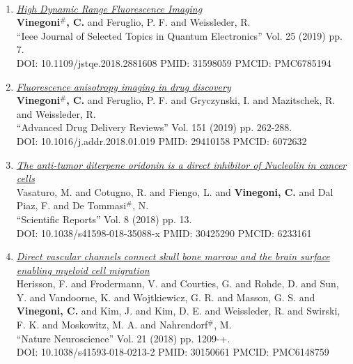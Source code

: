 \documentclass{resume}
\begin{document}
\begin{category}{~~}
\begin{enumerate}
\item \href{https://cvinegoni.github.io/assets/pdf/papers/2019-JSTQE.pdf}{\it  High Dynamic Range Fluorescence Imaging} \\ {\bf Vinegoni$^\#$, C.} and Feruglio, P. F. and Weissleder, R. \\ ``Ieee Journal of Selected Topics in Quantum Electronics'' Vol. 25 (2019) pp. 7. \\ DOI: 10.1109/jstqe.2018.2881608 PMID: 31598059 PMCID: PMC6785194

\item \href{https://cvinegoni.github.io/assets/pdf/papers/2019-ADDR.pdf}{\it  Fluorescence anisotropy imaging in drug discovery} \\ {\bf Vinegoni$^\#$, C.} and Feruglio, P. F. and Gryczynski, I. and Mazitschek, R. and Weissleder, R. \\ ``Advanced Drug Delivery Reviews'' Vol. 151 (2019) pp. 262-288. \\ DOI: 10.1016/j.addr.2018.01.019 PMID: 29410158 PMCID: 6072632

\item \href{https://cvinegoni.github.io/assets/pdf/papers/2018-SCIREP.pdf}{\it  The anti-tumor diterpene oridonin is a direct inhibitor of Nucleolin in cancer cells} \\ Vasaturo, M. and Cotugno, R. and Fiengo, L. and {\bf Vinegoni, C.} and Dal Piaz, F. and De Tommasi$^\#$, N. \\ ``Scientific Reports'' Vol. 8 (2018) pp. 13. \\ DOI: 10.1038/s41598-018-35088-x PMID: 30425290 PMCID: 6233161

\item \href{https://cvinegoni.github.io/assets/pdf/papers/2018-NATNEURO.pdf}{\it  Direct vascular channels connect skull bone marrow and the brain surface enabling myeloid cell migration} \\ Herisson, F. and Frodermann, V. and Courties, G. and Rohde, D. and Sun, Y. and Vandoorne, K. and Wojtkiewicz, G. R. and Masson, G. S. and {\bf Vinegoni, C.} and Kim, J. and Kim, D. E. and Weissleder, R. and Swirski, F. K. and Moskowitz, M. A. and Nahrendorf$^\#$, M. \\ ``Nature Neuroscience'' Vol. 21 (2018) pp. 1209-+. \\ DOI: 10.1038/s41593-018-0213-2 PMID: 30150661 PMCID: PMC6148759 


\end{enumerate}
\end{category}
\end{document}
